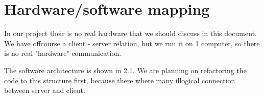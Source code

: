 \section{Hardware/software mapping}
In our project their is no real hardware that we should discuss in this document. We have offcourse a client - server relation, but we run it on 1 computer, so there is no real "hardware" communication. 

The software architecture is shown in 2.1. We are planning on refactoring the code to this structure first, because there where many illogical connection between server and client.